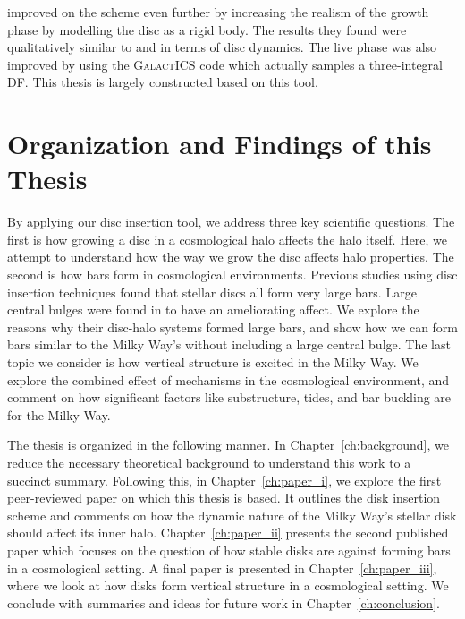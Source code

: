 \citet{bauer2018a} improved on the scheme even further by increasing the realism of the growth phase by modelling the disc as a rigid body. The results they found were qualitatively similar to \citet{debuhr_2012} and \citet{ys_2015}  in terms of disc dynamics. The live phase was also improved by using the \textsc{GalactICS} code which actually samples a three-integral DF. This thesis is largely constructed based on this tool.


\section{Organization and Findings of this Thesis}

By applying our disc insertion tool, we address three key scientific questions. The first is how growing a disc in a cosmological halo affects the halo itself. Here, we attempt to understand how the way we grow the disc affects halo properties. The second is how bars form in cosmological environments. Previous studies using disc insertion techniques found that stellar discs all form very large bars. Large central bulges were found in \citet{ys_2015} to have an ameliorating affect. We explore the reasons why their disc-halo systems formed large bars, and show how we can form bars similar to the Milky Way's without including a large central bulge. The last topic we consider is how vertical structure is excited in the Milky Way. We explore the combined effect of mechanisms in the cosmological environment, and comment on how significant factors like substructure, tides, and bar buckling are for the Milky Way.

The thesis is organized in the following manner. In Chapter~\ref{ch:background}, we reduce the necessary theoretical background to understand this work to a succinct summary. Following this, in Chapter~\ref{ch:paper_i}, we explore the first peer-reviewed paper on which this thesis is based. It outlines the disk insertion scheme and comments on how the dynamic nature of the Milky Way's stellar disk should affect its inner halo. Chapter~\ref{ch:paper_ii} presents the second published paper which focuses on the question of how stable disks are against forming bars in a cosmological setting. A final paper is presented in Chapter~\ref{ch:paper_iii}, where we look at how disks form vertical structure in a cosmological setting. We conclude with summaries and ideas for future work in Chapter~\ref{ch:conclusion}.


